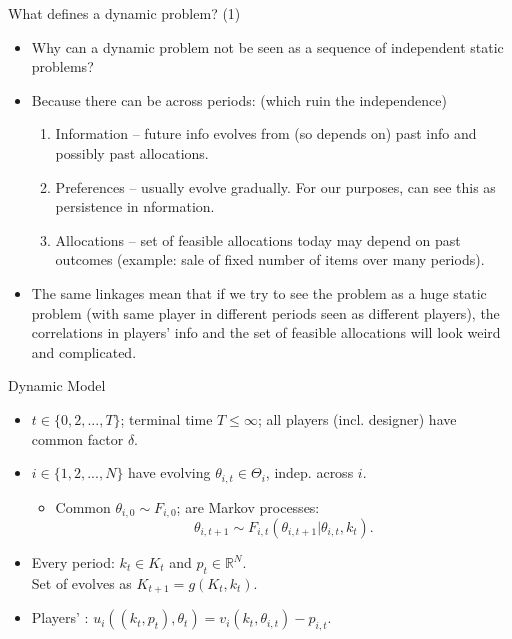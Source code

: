 \documentclass[english,10pt
,aspectratio=169
]{beamer}
\begin{document}
\begin{frame}{What defines a dynamic problem? (1)}
\begin{itemize}
	\item Why can a dynamic problem not be seen as a sequence of independent static problems? 
	
	\item Because there can be  across periods: (which ruin the independence)
	\begin{enumerate}
		\item \alert{Information} -- future info evolves from (so depends on) past info and possibly past allocations.
		\item \alert{Preferences} -- usually evolve gradually. For our purposes, can see this as persistence in nformation.
		\item \alert{Allocations} -- set of feasible allocations today may depend on past outcomes (example: sale of fixed number of items over many periods).
	\end{enumerate}

	\item The same linkages mean that if we try to see the problem as a huge static problem (with same player in different periods seen as different players), the correlations in players' info and the set of feasible allocations will look weird and complicated.
\end{itemize}
\end{frame}


\begin{frame}{Dynamic Model}
\begin{itemize}
	\item {} $t \in \{0,2,...,T\}$; terminal time $T \leq \infty$; all players (incl. designer) have common  factor $\delta$.
	\item {} $i \in \{1,2,...,N\}$ have evolving  $\theta_{i,t} \in \Theta_i$, \alert{indep}. across $i$.
	\begin{itemize}
		\item Common  $\theta_{i,0} \sim F_{i,0}$;  are Markov processes: $$\theta_{i,t+1} \sim F_{i,t}(\theta_{i,t+1} | \theta_{i,t},k_t).$$
	\end{itemize}
	\item Every period:  $k_t \in K_t$ and  $p_t \in \mathbb{R}^N$.
	\\ Set of  evolves as $K_{t+1} = g(K_t,k_t)$.
	\item Players' : $u_i((k_t,p_t),\theta_t) = v_i(k_t,\theta_{i,t}) - p_{i,t}$.
\end{itemize}
\end{frame}
\end{document}
